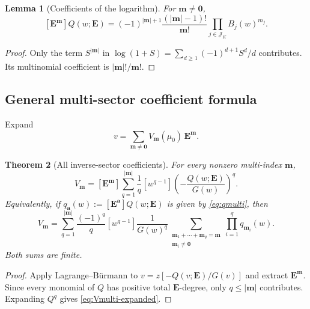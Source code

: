 \documentclass[11pt,a4paper]{article}
\numberwithin{equation}{section}
\newtheorem{theorem}{Theorem}[section]
\newtheorem{lemma}[theorem]{Lemma}
\theoremstyle{definition}
\theoremstyle{remark}
\newcommand{\Jcal}{\mathcal J}
\newcommand{\multi}[1]{\boldsymbol{#1}}
\newcommand{\abs}[1]{\lvert#1\rvert}
\begin{document}
\begin{lemma}[Coefficients of the logarithm]\label{lem:qmulti}
For $\multi m\neq\multi0$,
\begin{equation}\label{eq:qmulti}
 [\multi E^{\multi m}]Q(w;\multi E)=
 (-1)^{\abs{\multi m}+1}
 \frac{(\abs{\multi m}-1)!}{\multi m!}
 \prod_{j\in\Jcal_K}B_j(w)^{m_j}.
\end{equation}
\end{lemma}

\begin{proof}
Only the term $S^{\abs{\multi m}}$ in
$\log(1+S)=\sum_{d\geq1}(-1)^{d+1}S^d/d$ contributes.  Its multinomial
coefficient is $\abs{\multi m}!/\multi m!$.
\end{proof}

\subsection{General multi-sector coefficient formula}

Expand
\begin{equation}\label{eq:v-multi}
 v=\sum_{\multi m\neq\multi0}V_{\multi m}(\mu_0)\,
 \multi E^{\multi m}.
\end{equation}

\begin{theorem}[All inverse-sector coefficients]\label{thm:Vmulti}
For every nonzero multi-index $\multi m$,
\begin{equation}\label{eq:Vmulti-compact}
 \boxed{
 V_{\multi m}=
 [\multi E^{\multi m}]
 \sum_{q=1}^{\abs{\multi m}}\frac1q[w^{q-1}]
 \left(-\frac{Q(w;\multi E)}{G(w)}\right)^q.}
\end{equation}
Equivalently, if
$q_{\multi a}(w):=[\multi E^{\multi a}]Q(w;\multi E)$ is given by
\eqref{eq:qmulti}, then
\begin{equation}\label{eq:Vmulti-expanded}
 V_{\multi m}=
 \sum_{q=1}^{\abs{\multi m}}\frac{(-1)^q}{q}
 [w^{q-1}]\frac1{G(w)^q}
 \sum_{\substack{\multi m_1+\cdots+\multi m_q=\multi m\\
                  \multi m_i\neq\multi0}}
 \prod_{i=1}^q q_{\multi m_i}(w).
\end{equation}
Both sums are finite.
\end{theorem}

\begin{proof}
Apply Lagrange--B\"urmann to
$v=z[-Q(v;\multi E)/G(v)]$ and extract $\multi E^{\multi m}$.  Since every
monomial of $Q$ has positive total $\multi E$-degree, only
$q\leq\abs{\multi m}$ contributes.  Expanding $Q^q$ gives
\eqref{eq:Vmulti-expanded}.
\end{proof}
\end{document}
